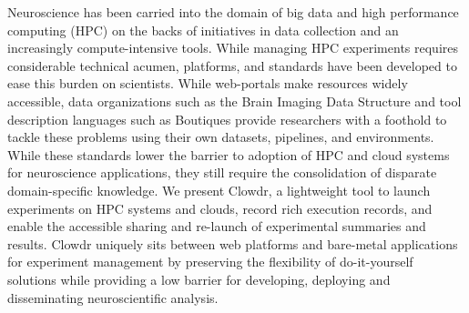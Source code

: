 Neuroscience has been carried into the domain of big data and high performance computing (HPC) on the backs of
initiatives in data collection and an increasingly compute-intensive tools. While managing HPC experiments requires
considerable technical acumen, platforms, and standards have been developed to ease this burden on scientists. While
web-portals make resources widely accessible, data organizations such as the Brain Imaging Data Structure and tool
description languages such as Boutiques provide researchers with a foothold to tackle these problems using their own
datasets, pipelines, and environments. While these standards lower the barrier to adoption of HPC and cloud systems
for neuroscience applications, they still require the consolidation of disparate domain-specific knowledge. We present
Clowdr, a lightweight tool to launch experiments on HPC systems and clouds, record rich execution records, and enable
the accessible sharing and re-launch of experimental summaries and results. Clowdr uniquely sits between web platforms
and bare-metal applications for experiment management by preserving the flexibility of do-it-yourself solutions while
providing a low barrier for developing, deploying and disseminating neuroscientific analysis.

